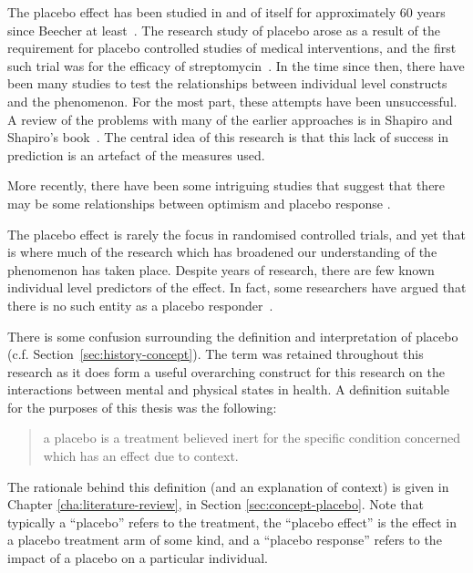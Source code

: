 The placebo effect has been studied in and of itself for approximately 60 years since Beecher at least~\cite{beecher1955powerful}. The research study of placebo arose as a result of the requirement for placebo controlled studies of medical interventions, and the first such trial was for the efficacy of streptomycin~\cite{concato2000randomized}. In the time since then, there have been many studies to test the relationships between individual level constructs and the phenomenon. For the most part, these attempts have been unsuccessful. A review of the problems with many of the earlier approaches is in Shapiro and Shapiro's book~\cite{Shapiro1997}.  The central idea of this research is that this lack of success in prediction is an artefact of the measures used. 

More recently, there have been some intriguing studies that suggest that there may be some relationships between optimism and placebo response \cite{Geers2005,morton2009reproducibility}.

The placebo effect is rarely the focus in randomised controlled trials, and yet that is where much of the research which has broadened our understanding of the phenomenon has taken place.
Despite years of research, there are few known individual level predictors of the effect. In fact, some researchers have argued that there is no such entity as a placebo responder~\cite{Kaptchuk2008a}. 


There is some confusion surrounding the definition and interpretation of placebo (c.f. Section~\ref{sec:history-concept}).  The term was retained throughout this research  as it does form a useful overarching construct for this research on the interactions between mental and physical states in health. A definition suitable for the purposes of this thesis was the following:

\begin{quotation}
  a placebo is a treatment believed inert for the specific condition
  concerned which has an effect due to context.
\end{quotation}

The rationale behind this definition (and an explanation of context) is given in Chapter \ref{cha:literature-review}, in Section \ref{sec:concept-placebo}. Note that typically a ``placebo'' refers to the treatment, the ``placebo effect'' is the effect in a placebo treatment arm of some kind, and a ``placebo response'' refers to the impact of a placebo on a particular individual.



